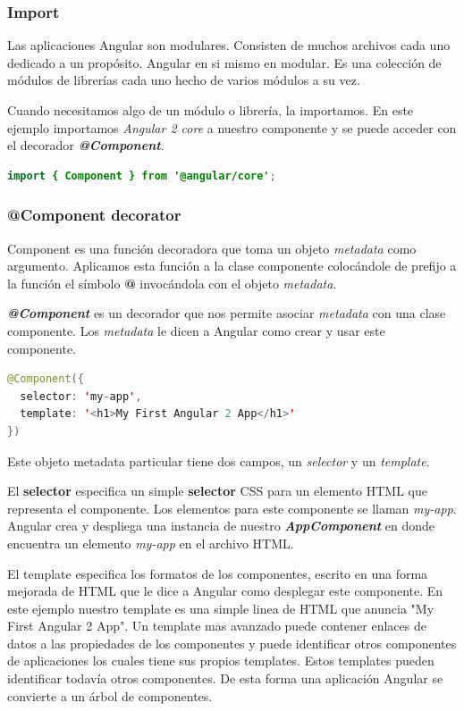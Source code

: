 \documentclass[12pt,twoside]{book}
\begin{document}
\subsubsection{Import}

Las aplicaciones Angular son modulares. Consisten de muchos archivos cada uno dedicado a un propósito. Angular en si mismo en modular. Es una colección de módulos de librerías cada uno hecho de varios módulos a su vez. 

Cuando necesitamos algo de un módulo o librería, la importamos. En este ejemplo importamos \textit{Angular 2 core} a nuestro componente y se puede acceder con el decorador \textit{\textbf{@Component}}.

\begin{lstlisting}[language=java]
import { Component } from '@angular/core';
\end{lstlisting}

\subsubsection{@Component decorator}

Component es una función decoradora que toma un objeto \textit{metadata} como argumento. Aplicamos esta función a la clase componente colocándole de prefijo a la función el símbolo \textbf{@} invocándola con el objeto \textit{metadata}.

\textit{\textbf{@Component}} es un decorador que nos permite asociar\textit{ metadata }con una clase componente. Los\textit{ metadata} le dicen a Angular como crear y usar este componente.

\begin{lstlisting}[language=java]
@Component({
  selector: 'my-app',
  template: '<h1>My First Angular 2 App</h1>'
})
\end{lstlisting}


Este objeto metadata particular tiene dos campos, un \textit{selector} y un \textit{template}.

El \textbf{selector} especifica un simple \textbf{selector} CSS para un elemento HTML que representa el componente. Los elementos para este componente se llaman \textit{my-app}. Angular crea y despliega una instancia de nuestro \textit{\textbf{AppComponent}} en donde encuentra un elemento \textit{my-app} en el archivo HTML.

El template especifica los formatos de los componentes, escrito en una forma mejorada de HTML que le dice a Angular como desplegar este componente. En este ejemplo nuestro template es una simple linea de HTML que anuncia "My First Angular 2 App". Un template mas avanzado puede contener enlaces de datos a las propiedades de los componentes y puede identificar otros componentes de aplicaciones los cuales tiene sus propios templates. Estos templates pueden identificar todavía otros componentes. De esta forma una aplicación Angular se convierte a un árbol de componentes.   
\end{document}
